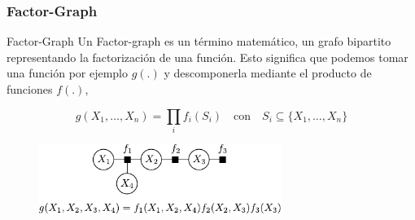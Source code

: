 \begin{frame}
    \frametitle{Factor-Graph}
    
    \begin{block}{Factor-Graph}
        Un Factor-graph es un término matemático, un grafo bipartito representando la factorización de una función. Esto significa que podemos tomar una función por ejemplo $g(.)$ y descomponerla mediante el producto de funciones $f(.)$,
        
        \begin{equation*}
            g(X_{1}, \dots, X_{n}) = \prod_{i} f_{i}(S_{i}) \quad \text{con} \quad S_{i} 	\subseteq \{ X_{1},\dots, X_{n} \}
        \end{equation*}
    \end{block}

    \begin{figure}[!h]
        \includegraphics[width=0.7\textwidth]{images/factor_graph_example.pdf}
    \end{figure}

    
\end{frame}


